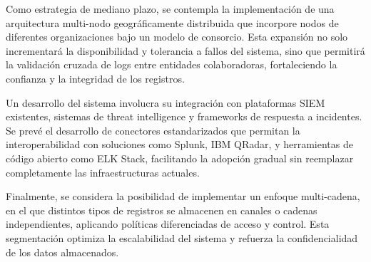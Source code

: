 Como estrategia de mediano plazo, se contempla la implementación de una arquitectura multi-nodo geográficamente distribuida que incorpore nodos de diferentes organizaciones bajo un modelo de consorcio. Esta expansión no solo incrementará la disponibilidad y tolerancia a fallos del sistema, sino que permitirá la validación cruzada de logs entre entidades colaboradoras, fortaleciendo la confianza y la integridad de los registros.

Un desarrollo del sistema involucra su integración con plataformas SIEM existentes, sistemas de threat intelligence y frameworks de respuesta a incidentes. Se prevé el desarrollo de conectores estandarizados que permitan la interoperabilidad con soluciones como Splunk, IBM QRadar, y herramientas de código abierto como ELK Stack, facilitando la adopción gradual sin reemplazar completamente las infraestructuras actuales.

Finalmente, se considera la posibilidad de implementar un enfoque multi-cadena, en el que distintos tipos de registros se almacenen en canales o cadenas independientes, aplicando políticas diferenciadas de acceso y control. Esta segmentación optimiza la escalabilidad del sistema y refuerza la confidencialidad de los datos almacenados.
